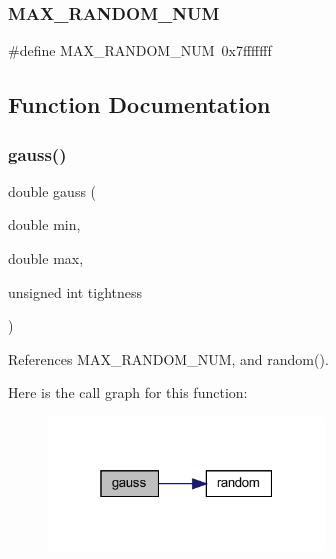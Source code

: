 \subsubsection{\texorpdfstring{M\+A\+X\+\_\+\+R\+A\+N\+D\+O\+M\+\_\+\+N\+UM}{MAX\_RANDOM\_NUM}}
{\footnotesize\ttfamily \#define M\+A\+X\+\_\+\+R\+A\+N\+D\+O\+M\+\_\+\+N\+UM~0x7fffffff}



\subsection{Function Documentation}
\mbox{\label{C-gauss_8c_accc1ca68e89030f8370eaa5093381e70}} 
\subsubsection{\texorpdfstring{gauss()}{gauss()}}
{\footnotesize\ttfamily double gauss (\begin{DoxyParamCaption}\item[{double}]{min,  }\item[{double}]{max,  }\item[{unsigned int}]{tightness }\end{DoxyParamCaption})}



References M\+A\+X\+\_\+\+R\+A\+N\+D\+O\+M\+\_\+\+N\+UM, and random().

Here is the call graph for this function\+:
\nopagebreak
\begin{figure}[H]
\begin{center}
\leavevmode
\includegraphics[width=208pt]{C-gauss_8c_accc1ca68e89030f8370eaa5093381e70_cgraph}
\end{center}
\end{figure}

